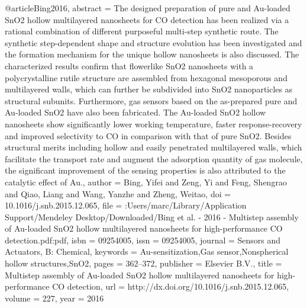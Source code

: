 @article{Bing2016,
abstract = {The designed preparation of pure and Au-loaded SnO2 hollow multilayered nanosheets for CO detection has been realized via a rational combination of different purposeful multi-step synthetic route. The synthetic step-dependent shape and structure evolution has been investigated and the formation mechanism for the unique hollow nanosheets is also discussed. The characterized results confirm that flowerlike SnO2 nanosheets with a polycrystalline rutile structure are assembled from hexagonal mesoporous and multilayered walls, which can further be subdivided into SnO2 nanoparticles as structural subunits. Furthermore, gas sensors based on the as-prepared pure and Au-loaded SnO2 have also been fabricated. The Au-loaded SnO2 hollow nanosheets show significantly lower working temperature, faster response-recovery and improved selectivity to CO in comparison with that of pure SnO2. Besides structural merits including hollow and easily penetrated multilayered walls, which facilitate the transport rate and augment the adsorption quantity of gas molecule, the significant improvement of the sensing properties is also attributed to the catalytic effect of Au.},
author = {Bing, Yifei and Zeng, Yi and Feng, Shengrao and Qiao, Liang and Wang, Yanzhe and Zheng, Weitao},
doi = {10.1016/j.snb.2015.12.065},
file = {:Users/marc/Library/Application Support/Mendeley Desktop/Downloaded/Bing et al. - 2016 - Multistep assembly of Au-loaded SnO2 hollow multilayered nanosheets for high-performance CO detection.pdf:pdf},
isbn = {09254005},
issn = {09254005},
journal = {Sensors and Actuators, B: Chemical},
keywords = {Au-sensitization,Gas sensor,Nonspherical hollow structures,SnO2},
pages = {362--372},
publisher = {Elsevier B.V.},
title = {{Multistep assembly of Au-loaded SnO2 hollow multilayered nanosheets for high-performance CO detection}},
url = {http://dx.doi.org/10.1016/j.snb.2015.12.065},
volume = {227},
year = {2016}
}
